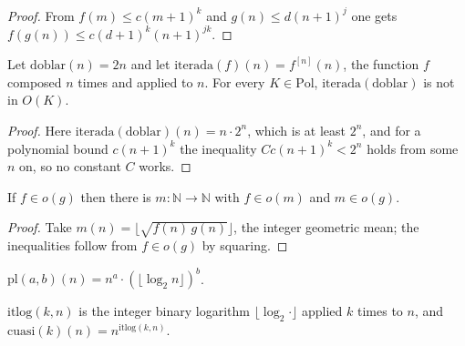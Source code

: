 \begin{proof}
  \leanok
  From $f(m) \le c (m + 1)^k$ and $g(n) \le d (n + 1)^j$ one gets
  $f(g(n)) \le c (d + 1)^k (n + 1)^{jk}$.
\end{proof}

\begin{theorem}
  \label{thm:machines-iterated}
  \leanok
  Let $\mathrm{doblar}(n) = 2n$ and let $\mathrm{iterada}(f)(n) = f^{[n]}(n)$, the function $f$
  composed $n$ times and applied to $n$. For every $K \in \mathrm{Pol}$, $\mathrm{iterada}(\mathrm{doblar})$
  is not in $O(K)$.
  \own{}
  \infrastructure{}
\end{theorem}

\begin{proof}
  \leanok
  Here $\mathrm{iterada}(\mathrm{doblar})(n) = n \cdot 2^n$, which is at least $2^n$, and for a polynomial bound
  $c (n + 1)^k$ the inequality $C c (n + 1)^k < 2^n$ holds from some $n$ on, so no constant $C$ works.
\end{proof}

\begin{theorem}
  \label{thm:machines-dense}
  \leanok
  If $f \in o(g)$ then there is $m : \mathbb{N} \to \mathbb{N}$ with $f \in o(m)$ and $m \in o(g)$.
  \own{}
  \infrastructure{}
\end{theorem}

\begin{proof}
  \leanok
  Take $m(n) = \lfloor \sqrt{f(n)\, g(n)} \rfloor$, the integer geometric mean; the inequalities follow
  from $f \in o(g)$ by squaring.
\end{proof}

\begin{definition}
  \label{def:machines-scale}
  \leanok
  $\mathrm{pl}(a, b)(n) = n^a \cdot (\lfloor \log_2 n \rfloor)^b$.
  \own{}
  \infrastructure{}
\end{definition}

\begin{definition}
  \label{def:machines-quasi}
  \leanok
  $\mathrm{itlog}(k, n)$ is the integer binary logarithm $\lfloor \log_2 \cdot \rfloor$ applied $k$ times to
  $n$, and $\mathrm{cuasi}(k)(n) = n^{\mathrm{itlog}(k, n)}$.
  \own{}
  \infrastructure{}
\end{definition}

